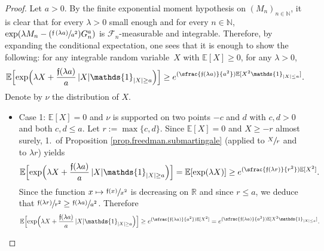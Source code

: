 \documentclass[JEP,XML,SOM,Unicode,published]{cedram}
\newcommand\mto{\mathchoice{\longmapsto}{\mapsto}{\mapsto}{\mapsto}}
\newcommand{\Psfrac}[2]{(\sfrac{#1}{#2})}
\theoremstyle{plain}
\theoremstyle{definition}
\newcommand\E{\mathbb{E}}
\newcommand\R{\mathbb{R}}
\newcommand\N{\mathbb{N}}
\begin{document}
\begin{proof} Let $a>0$. By the finite exponential moment hypothesis on $(M_n)_{n \in \N}$, it is clear that for every $\lambda>0$ small enough and for every $n \in \N$, $\exp(\lambda M_n - \Psfrac{\mathfrak{f}\,(\lambda a)}{a^2}G_n^a)$ is $\mathcal{F}_n$-measurable and integrable. Therefore, by expanding the conditional expectation, one sees that it is enough to show the following: for any integrable random variable~$X$ with $\E[X]\geq 0$, for any $\lambda>0$,
\begin{equation}\label{inequality.super}
\E\Bigl[\exp\Bigl(\lambda X + \frac{\mathfrak{f}(\lambda a)}{ a}\, |X| \mathds{1}_{|X|\geq a}\Bigr)\Bigr]
\geq e^{\Psfrac{\mathfrak{f}(\lambda a)}{a^2} \E[X^2 \mathds{1}_{|X| \leq a}]}.\end{equation}
Denote by $\nu$ the distribution of $X$.
\begin{itemize}
\item Case 1: $\E[X]=0$ and $\nu$ is supported on two points $-c$ and $d$ with $c,d>0$ and both $c,d \leq a$. Let $r:=\max\{c,d\}$.
Since $\E[X]= 0$ and
$X\geq -r$ almost surely, 1.~of Proposition \ref{prop.freedman.submartingale} (applied to $\sfrac{X}{r}$ and to $\lambda r$) yields
\[
\E\Bigl[\exp\Bigl(\lambda X + \frac{\mathfrak{f}(\lambda a)}{ a}\, |X| \mathds{1}_{|X|\geq a}\Bigr)\Bigr]= \E[\exp(\lambda X)]\geq e^{\Psfrac{\mathfrak{f}(\lambda r)}{r^2} \E[X^2]}.
\]
Since the function $x\mto \sfrac{\mathfrak{f}(x)}{x^2}$ is decreasing on $\R$ and since $r \leq a$, we deduce that $\sfrac{\mathfrak{f}(\lambda r)}{r^2}\geq \sfrac{\mathfrak{f}(\lambda a)}{a^2}$. Therefore
\[
\E\Bigl[\exp\Bigl(\lambda X + \frac{\mathfrak{f}(\lambda a)}{a}\, |X| \mathds{1}_{|X|\geq a}\Bigr)\Bigr]\geq e^{\Psfrac{\mathfrak{f}(\lambda a) }{a^2} \E[X^2]} = e^{\Psfrac{\mathfrak{f}(\lambda a)}{a^2} \E[X^2 \mathds{1}_{|X|\leq a}]}.
\]


\end{itemize}
\end{proof}
\end{document}

